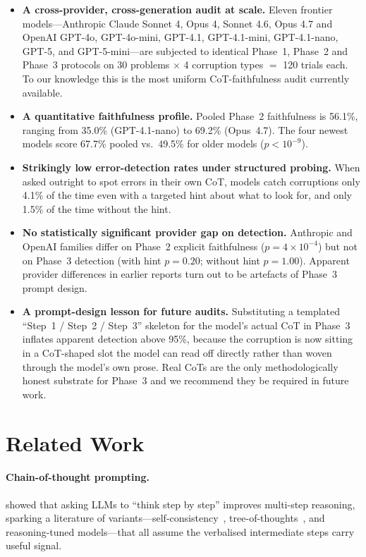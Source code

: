 \documentclass[11pt]{article}
\begin{document}
\begin{itemize}
    \item \textbf{A cross-provider, cross-generation audit at scale.} Eleven frontier models---Anthropic Claude Sonnet 4, Opus 4, Sonnet 4.6, Opus 4.7 and OpenAI GPT-4o, GPT-4o-mini, GPT-4.1, GPT-4.1-mini, GPT-4.1-nano, GPT-5, and GPT-5-mini---are subjected to identical Phase~1, Phase~2 and Phase~3 protocols on 30 problems $\times$ 4 corruption types $=$ 120 trials each. To our knowledge this is the most uniform CoT-faithfulness audit currently available.
    \item \textbf{A quantitative faithfulness profile.} Pooled Phase~2 faithfulness is 56.1\%, ranging from 35.0\% (GPT-4.1-nano) to 69.2\% (Opus~4.7). The four newest models score 67.7\% pooled vs.\ 49.5\% for older models ($p<10^{-9}$).
    \item \textbf{Strikingly low error-detection rates under structured probing.} When asked outright to spot errors in their own CoT, models catch corruptions only 4.1\% of the time even with a targeted hint about what to look for, and only 1.5\% of the time without the hint.
    \item \textbf{No statistically significant provider gap on detection.} Anthropic and OpenAI families differ on Phase~2 explicit faithfulness ($p=4\!\times\!10^{-4}$) but not on Phase~3 detection (with hint $p=0.20$; without hint $p=1.00$). Apparent provider differences in earlier reports turn out to be artefacts of Phase~3 prompt design.
    \item \textbf{A prompt-design lesson for future audits.} Substituting a templated ``Step~1 / Step~2 / Step~3'' skeleton for the model's actual CoT in Phase~3 inflates apparent detection above 95\%, because the corruption is now sitting in a CoT-shaped slot the model can read off directly rather than woven through the model's own prose. Real CoTs are the only methodologically honest substrate for Phase~3 and we recommend they be required in future work.
\end{itemize}

\section{Related Work}

\paragraph{Chain-of-thought prompting.} \citet{wei2022chain} showed that asking LLMs to ``think step by step'' improves multi-step reasoning, sparking a literature of variants---self-consistency~\citep{wang2022self}, tree-of-thoughts~\citep{yao2023tree}, and reasoning-tuned models---that all assume the verbalised intermediate steps carry useful signal.
\end{document}
